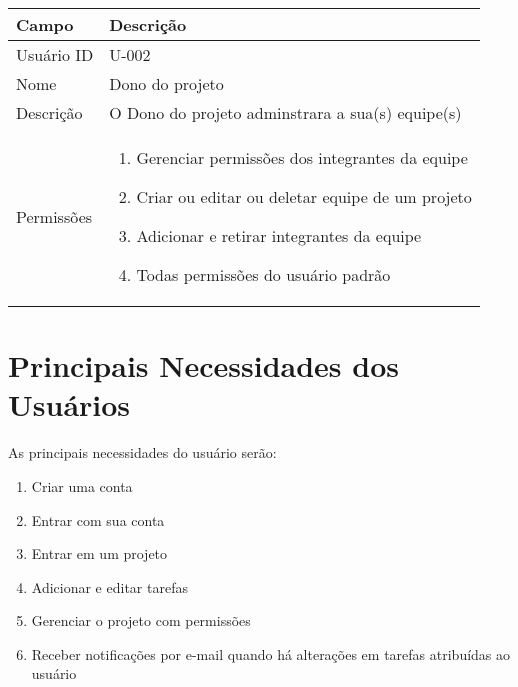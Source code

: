 \noindent
\begin{tabularx}{\textwidth}{| l | X |}
\hline
Campo             & Descrição                                                                                                                                                                           \\ \hline
Usuário ID    & U-002                                                                                                                                                                              \\ \hline
Nome              & Dono do projeto                                                                                                                                                                       \\ \hline
Descrição         & O Dono do projeto adminstrara a sua(s) equipe(s) 
\\ \hline
Permissões &
\begin{enumerate}
    \item Gerenciar permissões dos integrantes da equipe
    \item Criar ou editar ou deletar equipe de um projeto 
    \item Adicionar e retirar integrantes da equipe
    \item Todas permissões do usuário padrão
\end{enumerate}
\\ \hline

\end{tabularx}

\vspace{1cm}

\section{Principais Necessidades dos Usuários}

As principais necessidades do usuário serão:
\begin{enumerate}[leftmargin=2.5\parindent]
    \item Criar uma conta
    \item Entrar com sua conta 
    \item Entrar em um projeto
    \item Adicionar e editar tarefas
    \item Gerenciar o projeto com permissões
    \item Receber notificações por e-mail quando há alterações em  tarefas atribuídas ao usuário
\end{enumerate}